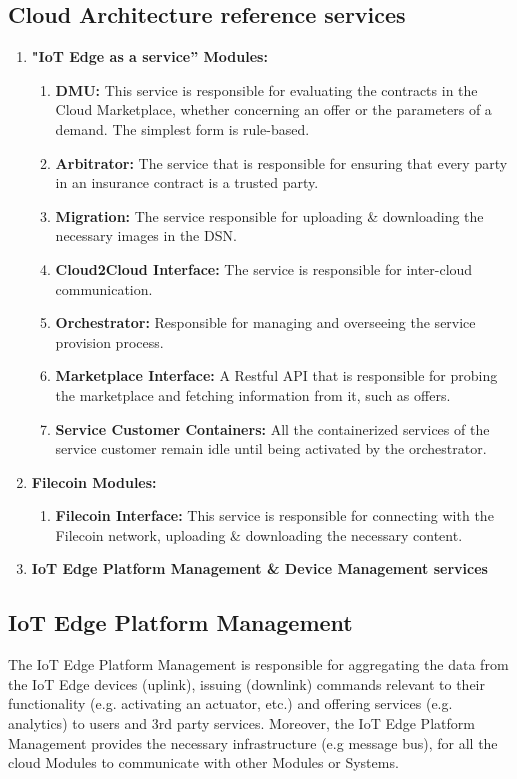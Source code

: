\subsection{Cloud Architecture reference services}

\begin{enumerate}
    \item \textbf{"IoT Edge as a service” Modules:}
    \begin{enumerate}[label*=\arabic*.]
    \item \textbf{DMU:} This service is responsible for evaluating the contracts in the Cloud Marketplace, whether concerning an offer or the parameters of a demand. The simplest form is rule-based.
    \item \textbf{Arbitrator:} The service that is responsible for ensuring that every party in an insurance contract is a trusted party.
    \item \textbf{Migration:} The service responsible for uploading \& downloading the necessary images in the DSN.
    \item \textbf{Cloud2Cloud Interface:} The service is responsible for inter-cloud communication.
    \item \textbf{Orchestrator:} Responsible for managing and overseeing the service provision process.
    \item \textbf{Marketplace Interface:} A Restful API that is responsible for probing the marketplace and fetching information from it, such as offers.
    \item \textbf{Service Customer Containers:} All the containerized services of the service customer remain idle until being activated by the orchestrator.
    \end{enumerate}
    \item \textbf{Filecoin Modules:}
     \begin{enumerate}[label*=\arabic*.]
     \item \textbf{Filecoin Interface:}  This service is responsible for connecting with the Filecoin network, uploading \& downloading the necessary content.
    \end{enumerate}
    \item \textbf{IoT Edge Platform Management \& Device Management services}
 \end{enumerate}  

\subsection{IoT Edge Platform Management}
    The IoT Edge Platform Management is responsible for aggregating the data from the IoT Edge devices (uplink), issuing (downlink) commands relevant to their functionality (e.g. activating an actuator, etc.) and offering services (e.g. analytics) to users and 3rd party services. Moreover, the IoT Edge Platform Management provides the necessary infrastructure (e.g message bus), for all the cloud Modules to communicate with other Modules or Systems.
    
